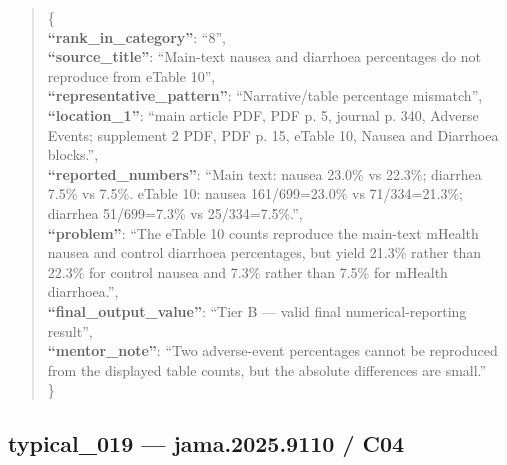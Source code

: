 \documentclass[
  letterpaper,
  9pt]{extreport}
\begin{document}
\begin{quote}
\{\\
\textbf{``rank\_in\_category''}: ``8'',\\
\textbf{``source\_title''}: ``Main-text nausea and diarrhoea percentages
do not reproduce from eTable 10'',\\
\textbf{``representative\_pattern''}: ``Narrative/table percentage
mismatch'',\\
\textbf{``location\_1''}: ``main article PDF, PDF p. 5, journal p. 340,
Adverse Events; supplement 2 PDF, PDF p. 15, eTable 10, Nausea and
Diarrhoea blocks.'',\\
\textbf{``reported\_numbers''}: ``Main text: nausea 23.0\% vs 22.3\%;
diarrhea 7.5\% vs 7.5\%. eTable 10: nausea 161/699=23.0\% vs
71/334=21.3\%; diarrhea 51/699=7.3\% vs 25/334=7.5\%.'',\\
\textbf{``problem''}: ``The eTable 10 counts reproduce the main-text
mHealth nausea and control diarrhoea percentages, but yield 21.3\%
rather than 22.3\% for control nausea and 7.3\% rather than 7.5\% for
mHealth diarrhoea.'',\\
\textbf{``final\_output\_value''}: ``Tier B --- valid final
numerical-reporting result'',\\
\textbf{``mentor\_note''}: ``Two adverse-event percentages cannot be
reproduced from the displayed table counts, but the absolute differences
are small.''\\
\}
\end{quote}

\hypertarget{typical_019--jama20259110--c04}{%
\subsection{typical\_019 --- jama.2025.9110 /
C04}\label{typical_019--jama20259110--c04}}
\end{document}
